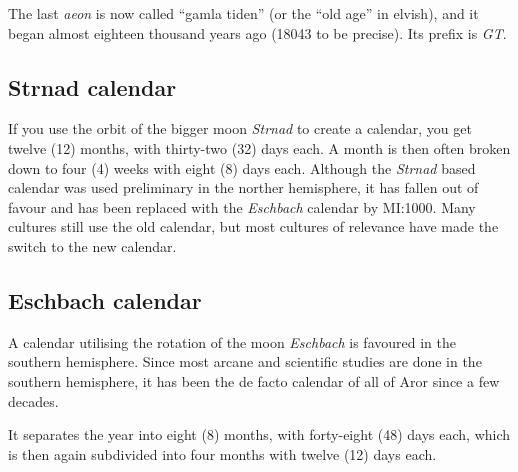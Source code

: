 The last \emph{aeon} is now called ``gamla tiden'' (or the ``old age''
in elvish), and it began almost eighteen thousand years ago (18043 to
be precise). Its prefix is \emph{GT}.

\subsection*{Strnad calendar}

If you use the orbit of the bigger moon \emph{Strnad} to create a
calendar, you get twelve (12) months, with thirty-two (32) days
each. A month is then often broken down to four (4) weeks with eight
(8) days each. Although the \emph{Strnad} based calendar was used
preliminary in the norther hemisphere, it has fallen out of favour and
has been replaced with the \emph{Eschbach} calendar by MI:1000. Many
cultures still use the old calendar, but most cultures of relevance
have made the switch to the new calendar.

\subsection*{Eschbach calendar}

A calendar utilising the rotation of the moon \emph{Eschbach} is favoured
in the southern hemisphere. Since most arcane and scientific studies are
done in the southern hemisphere, it has been the de facto calendar of all
of Aror since a few decades.

It separates the year into eight (8) months, with forty-eight (48) days
each, which is then again subdivided into four months with twelve (12)
days each.
